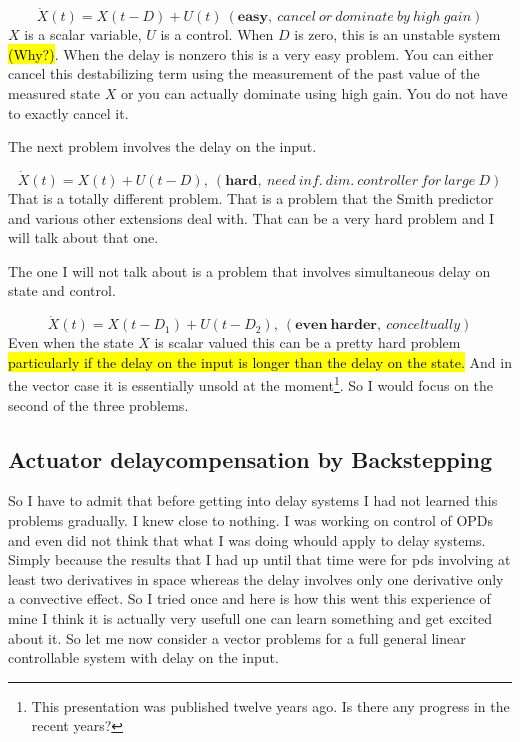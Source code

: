 \documentclass[idxtotoc,hyperref,openany]{labbook} %
\begin{document}
\begin{equation}
\dot{X}(t) = X(t-D) + U(t)~(\mathbf{easy},~cancel~or~dominate~by~high~gain)
\end{equation} $X$ is a scalar variable, $U$ is a control. When $D$ is zero, this is an unstable system \hl{(Why?)}. When the delay is nonzero this is a very easy problem. You can either cancel this destabilizing term using the measurement of the past value of the measured state $X$ or you can actually dominate using high gain. You do not have to exactly cancel it.

The next problem involves the delay on the input.

\begin{equation}
\dot{X}(t) = X(t) + U(t-D),~(\mathbf{hard},~need~inf.~dim.~controller~for~large~D)
\end{equation} That is a totally different problem. That is a problem that the Smith predictor and various other extensions deal with. That can be a very hard problem and I will talk about that one.

The one I will not talk about is a problem that involves simultaneous delay on state and control.

\begin{equation}
\dot{X}(t) = X(t-D_1) + U(t-D_2),~(\mathbf{even~harder},~conceltually)
\end{equation} Even when the state $X$ is scalar valued this can be a pretty hard problem \hl{particularly if the delay on the input is longer than the delay on the state.} And in the vector case it is essentially unsold at the moment\footnote{This presentation was published twelve years ago. Is there any progress in the recent years?}. So I would focus on the second of the three problems.

\subsection{Actuator delaycompensation by Backstepping}

So I have to admit that before getting into delay systems I had not learned this problems gradually. I knew close to nothing. I was working on control of OPDs and even did not think that what I was doing whould apply to delay systems. Simply because the results that I had up until that time were for pds involving at least two derivatives in space whereas the delay involves only one derivative only a convective effect. So I tried once and here is how this went this experience of mine I think it is actually very usefull one can learn something and get excited about it. So let me now consider a vector problems for a full general linear controllable system with delay on the input.
\end{document}
